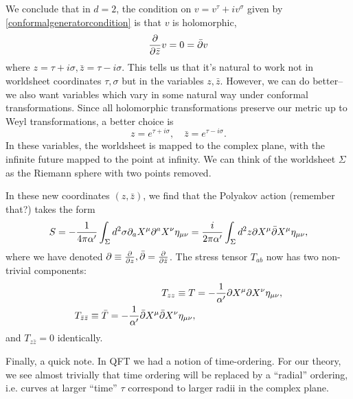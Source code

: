 We conclude that in $d=2$, the condition on $v=v^\tau +i v^\sigma$ given by \ref{conformalgeneratorcondition} is that $v$ is holomorphic,
\begin{equation}
    \frac{\partial }{\partial \bar z} v = 0 = \bar {\partial} v
\end{equation}
where $z= \tau+i\sigma, \bar z = \tau-i\sigma$. This tells us that it's natural to work not in worldsheet coordinates $\tau,\sigma$ but in the variables $z,\bar z$. However, we can do better-- we also want variables which vary in some natural way under conformal transformations. Since all holomorphic transformations preserve our metric up to Weyl transformations, a better choice is
\begin{equation}
    z=e^{\tau +i\sigma},\quad \bar z= e^{\tau-i\sigma}.
\end{equation}
In these variables, the worldsheet is mapped to the complex plane, with the infinite future mapped to the point at infinity. We can think of the worldsheet $\Sigma$ as the Riemann sphere with two points removed.

In these new coordinates $(z,\bar z)$, we find that the Polyakov action (remember that?) takes the form
\begin{equation}
    S=-\frac{1}{4\pi \alpha'} \int_\Sigma d^2\sigma \partial_a X^\mu \partial^a X^\nu \eta_{\mu\nu}=\frac{i}{2\pi \alpha'}\int_\Sigma d^2 z \partial X^\mu \bar {\partial} X^\mu \eta_{\mu\nu},
\end{equation}
where we have denoted $\partial\equiv \frac{\partial }{\partial z},\bar {\partial}=\frac{\partial }{\partial \bar z}$.
The stress tensor $T_{ab}$ now has two non-trivial components:
\begin{align}
    T_{zz}\equiv T &=-\frac{1}{\alpha'} \partial X^\mu \partial X^\nu \eta_{\mu\nu},\\
    T_{\bar z \bar z} \equiv \bar T = -\frac{1}{\alpha'} \bar {\partial} X^\mu \bar {\partial} X^\nu \eta_{\mu\nu},
\end{align}
and $T_{z\bar z}=0$ identically.

Finally, a quick note. In QFT we had a notion of time-ordering. For our theory, we see almost trivially that time ordering will be replaced by a ``radial'' ordering, i.e. curves at larger ``time'' $\tau$ correspond to larger radii in the complex plane.